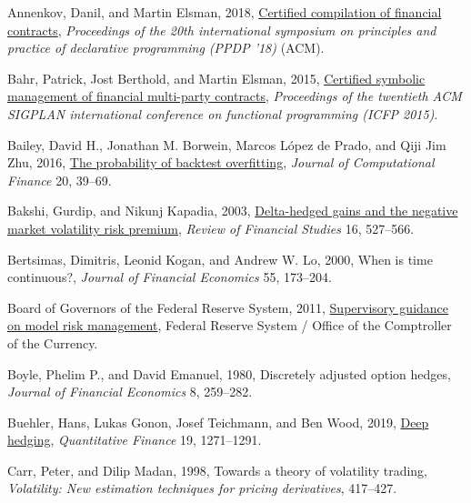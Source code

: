 \documentclass[
  11pt,
  letterpaper,
  DIV=12,
  numbers=noendperiod]{scrartcl}
\newlength{\cslhangindent}
\newenvironment{CSLReferences}[2] %
 {\begin{list}{}{%
  \setlength{\itemindent}{0pt}
  \setlength{\leftmargin}{0pt}
  \setlength{\parsep}{0pt}
  \ifodd #1
   \setlength{\leftmargin}{\cslhangindent}
   \setlength{\itemindent}{-1\cslhangindent}
  \fi
  \setlength{\itemsep}{#2\baselineskip}}}
 {\end{list}}
\numberwithin{equation}{section}
\numberwithin{figure}{section}
\numberwithin{table}{section}
\begin{document}
\label{refs}
\begin{CSLReferences}{0}{1}
Annenkov, Danil, and Martin Elsman, 2018,
\href{https://doi.org/10.1145/3236950.3236955}{Certified compilation of
financial contracts}, \emph{Proceedings of the 20th international
symposium on principles and practice of declarative programming ({PPDP}
'18)} (ACM).

Bahr, Patrick, Jost Berthold, and Martin Elsman, 2015,
\href{https://doi.org/10.1145/2784731.2784747}{Certified symbolic
management of financial multi-party contracts}, \emph{Proceedings of the
twentieth {ACM SIGPLAN} international conference on functional
programming ({ICFP} 2015)}.

Bailey, David H., Jonathan M. Borwein, Marcos López de Prado, and Qiji
Jim Zhu, 2016, \href{https://doi.org/10.21314/jcf.2016.322}{The
probability of backtest overfitting}, \emph{Journal of Computational
Finance} 20, 39--69.

Bakshi, Gurdip, and Nikunj Kapadia, 2003,
\href{https://doi.org/10.1093/rfs/hhg002}{Delta-hedged gains and the
negative market volatility risk premium}, \emph{Review of Financial
Studies} 16, 527--566.

Bertsimas, Dimitris, Leonid Kogan, and Andrew W. Lo, 2000, When is time
continuous?, \emph{Journal of Financial Economics} 55, 173--204.

Board of Governors of the Federal Reserve System, 2011,
\href{https://www.occ.gov/news-issuances/bulletins/2011/bulletin-2011-12.html}{Supervisory
guidance on model risk management}, Federal Reserve System / Office of
the Comptroller of the Currency.

Boyle, Phelim P., and David Emanuel, 1980, Discretely adjusted option
hedges, \emph{Journal of Financial Economics} 8, 259--282.

Buehler, Hans, Lukas Gonon, Josef Teichmann, and Ben Wood, 2019,
\href{https://doi.org/10.1080/14697688.2019.1571683}{Deep hedging},
\emph{Quantitative Finance} 19, 1271--1291.

Carr, Peter, and Dilip Madan, 1998, Towards a theory of volatility
trading, \emph{Volatility: New estimation techniques for pricing
derivatives}, 417--427.


\end{CSLReferences}
\end{document}
